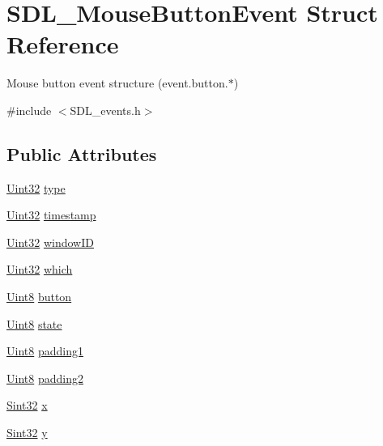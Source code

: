 \hypertarget{struct_s_d_l___mouse_button_event}{\section{S\-D\-L\-\_\-\-Mouse\-Button\-Event Struct Reference}
\label{struct_s_d_l___mouse_button_event}
}


Mouse button event structure (event.\-button.$\ast$)  




{\ttfamily \#include $<$S\-D\-L\-\_\-events.\-h$>$}

\subsection*{Public Attributes}
\begin{DoxyCompactItemize}
\item 
\hyperlink{_s_d_l__stdinc_8h_add440eff171ea5f55cb00c4a9ab8672d}{Uint32} \hyperlink{struct_s_d_l___mouse_button_event_af64cb09ea68b8081ecc8ee498552e3d7}{type}
\item 
\hyperlink{_s_d_l__stdinc_8h_add440eff171ea5f55cb00c4a9ab8672d}{Uint32} \hyperlink{struct_s_d_l___mouse_button_event_ab05e8a454692608ff56c502e95799c56}{timestamp}
\item 
\hyperlink{_s_d_l__stdinc_8h_add440eff171ea5f55cb00c4a9ab8672d}{Uint32} \hyperlink{struct_s_d_l___mouse_button_event_ab3b855d4b543b5d02fcf5d56e4421393}{window\-I\-D}
\item 
\hyperlink{_s_d_l__stdinc_8h_add440eff171ea5f55cb00c4a9ab8672d}{Uint32} \hyperlink{struct_s_d_l___mouse_button_event_a366aef59a0f393afc8a3561e741825df}{which}
\item 
\hyperlink{_s_d_l__stdinc_8h_a2944638813a090aa23e62f4da842c3e2}{Uint8} \hyperlink{struct_s_d_l___mouse_button_event_a1a4680e19ae06d02d2093f0bcba1b24c}{button}
\item 
\hyperlink{_s_d_l__stdinc_8h_a2944638813a090aa23e62f4da842c3e2}{Uint8} \hyperlink{struct_s_d_l___mouse_button_event_a8809cef85cfffad4f2059f2ba4fc6a3d}{state}
\item 
\hyperlink{_s_d_l__stdinc_8h_a2944638813a090aa23e62f4da842c3e2}{Uint8} \hyperlink{struct_s_d_l___mouse_button_event_a765957d218d16fa00558fa4d20e80689}{padding1}
\item 
\hyperlink{_s_d_l__stdinc_8h_a2944638813a090aa23e62f4da842c3e2}{Uint8} \hyperlink{struct_s_d_l___mouse_button_event_a344c3f10b6d7c60394fa55c7001e72a8}{padding2}
\item 
\hyperlink{_s_d_l__stdinc_8h_a7a90b941db9d4582e9ad7abb9940ff7e}{Sint32} \hyperlink{struct_s_d_l___mouse_button_event_a5bb9c61b86e999f58637511e32e3a076}{x}
\item 
\hyperlink{_s_d_l__stdinc_8h_a7a90b941db9d4582e9ad7abb9940ff7e}{Sint32} \hyperlink{struct_s_d_l___mouse_button_event_a7ccb5c55a7ddadce723f4ea6d5269540}{y}
\end{DoxyCompactItemize}


